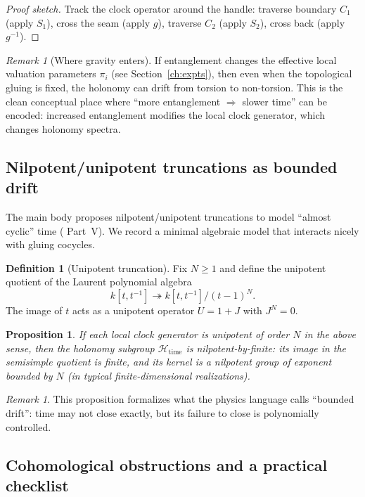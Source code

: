 \documentclass[11pt,oneside]{amsbook}
\numberwithin{equation}{section}
\theoremstyle{plain}
\newtheorem{proposition}[theorem]{Proposition}
\theoremstyle{definition}
\newtheorem{definition}[theorem]{Definition}
\theoremstyle{remark}
\newtheorem{remark}[theorem]{Remark}
\newcommand{\cH}{\mathcal{H}}
\begin{document}
\begin{proof}[Proof sketch]
Track the clock operator around the handle: traverse boundary $C_1$ (apply $S_1$), cross the seam (apply $g$), traverse $C_2$ (apply $S_2$), cross back (apply $g^{-1}$).
\end{proof}

\begin{remark}[Where gravity enters]
If entanglement changes the effective local valuation parameters $\pi_i$ (see Section~\ref{ch:expts}), then even when the topological gluing is fixed, the holonomy can drift from torsion to non-torsion.
This is the clean conceptual place where ``more entanglement $\Rightarrow$ slower time'' can be encoded: increased entanglement modifies the local clock generator, which changes holonomy spectra.
\end{remark}

\subsection{Nilpotent/unipotent truncations as bounded drift}
\label{sec:unipotent}

The  main body proposes nilpotent/unipotent truncations to model ``almost cyclic'' time ( Part~V).
We record a minimal algebraic model that interacts nicely with gluing cocycles.

\begin{definition}[Unipotent truncation]
Fix $N\ge 1$ and define the unipotent quotient of the Laurent polynomial algebra
\[
k[t,t^{-1}] \twoheadrightarrow k[t,t^{-1}]/(t-1)^N.
\]
The image of $t$ acts as a unipotent operator $U=1+J$ with $J^N=0$.
\end{definition}

\begin{proposition}
\label{prop:unipotent_holonomy}
If each local clock generator is unipotent of order $N$ in the above sense, then the holonomy subgroup $\cH_{\mathrm{time}}$ is nilpotent-by-finite: its image in the semisimple quotient is finite, and its kernel is a nilpotent group of exponent bounded by $N$ (in typical finite-dimensional realizations).
\end{proposition}

\begin{remark}
This proposition formalizes what the physics language calls ``bounded drift'': time may not close exactly, but its failure to close is polynomially controlled.
\end{remark}

\subsection{Cohomological obstructions and a practical checklist}
\label{sec:checklist}
\end{document}
